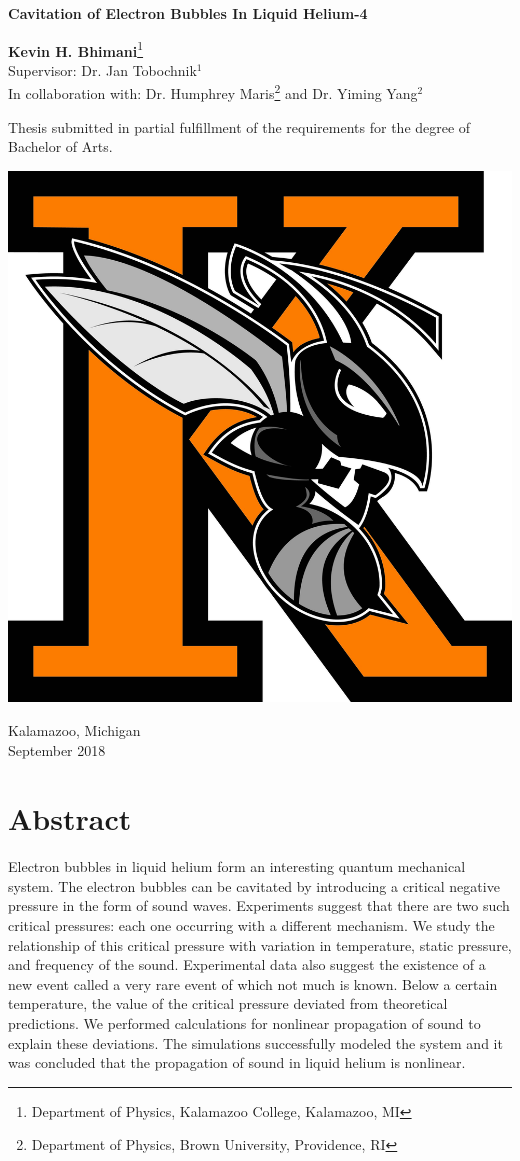\documentclass[12pt,twoside]{report}
\begin{document}
\begin{titlepage}
    \begin{center}
        \vspace*{1cm}
        
        \Huge
        \textbf{Cavitation of Electron Bubbles In Liquid Helium-4}
        
        \vspace{0.5cm}
        \LARGE
        
        \vspace{1.5cm}
        
        \textbf{Kevin H. Bhimani}\footnote{Department of Physics, Kalamazoo College, Kalamazoo, MI}\\
        Supervisor: Dr. Jan Tobochnik$^1$\\
        In collaboration with: Dr. Humphrey Maris\footnote{Department of Physics, Brown University, Providence, RI} and Dr. Yiming Yang$^2$
        \vfill
        
       Thesis submitted in partial fulfillment of the requirements for the degree of Bachelor of Arts.
        \vspace{0.8cm}
        
        \includegraphics[height=0.2\textwidth]{Klogo.jpg}
        
        \Large
        Kalamazoo, Michigan\\
        September 2018
        
    \end{center}
\end{titlepage}

\chapter*{Abstract}
Electron bubbles in liquid helium form an interesting quantum mechanical system. The electron bubbles can be cavitated by introducing a critical negative pressure in the form of sound waves. Experiments suggest that there are two such critical pressures: each one occurring with a different mechanism. We study the relationship of this critical pressure with variation in temperature, static pressure, and frequency of the sound. Experimental data also suggest the existence of a new event called a very rare event of which not much is known. Below a certain temperature, the value of the critical pressure deviated from theoretical predictions. We performed calculations for nonlinear propagation of sound to explain these deviations. The simulations successfully modeled the system and it was concluded that the propagation of sound in liquid helium is nonlinear.
\end{document}
